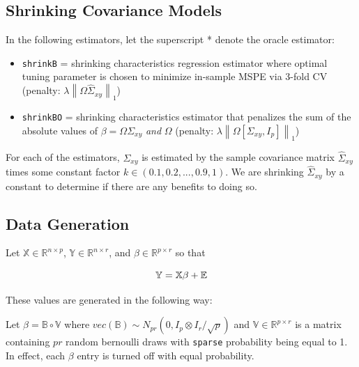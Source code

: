 \documentclass[11pt,]{report}
\begin{document}
\hypertarget{shrinking-covariance-models}{%
\subsection{Shrinking Covariance Models}\label{shrinking-covariance-models}}

In the following estimators, let the superscript * denote the oracle estimator:

\begin{itemize}
\item
  \texttt{shrinkB} = shrinking characteristics regression estimator where optimal tuning parameter is chosen to minimize in-sample MSPE via 3-fold CV (penalty: \(\lambda\left\| \Omega\hat{\Sigma}_{xy} \right\|_{1}\))
\item
  \texttt{shrinkBO} = shrinking characteristics estimator that penalizes the sum of the absolute values of \(\beta = \Omega\Sigma_{xy}\) \emph{and} \(\Omega\) (penalty: \(\lambda\left\| \Omega[\Sigma_{xy}, I_{p}] \right\|_{1}\))
\end{itemize}

For each of the estimators, \(\Sigma_{xy}\) is estimated by the sample covariance matrix \(\hat{\Sigma}_{xy}\) times some constant factor \(k \in (0.1, 0.2, ..., 0.9, 1)\). We are shrinking \(\hat{\Sigma}_{xy}\) by a constant to determine if there are any benefits to doing so.

\hypertarget{data-generation-1}{%
\subsection{Data Generation}\label{data-generation-1}}

Let \(\mathbb{X} \in \mathbb{R}^{n \times p}\), \(\mathbb{Y} \in \mathbb{R}^{n \times r}\), and \(\beta \in \mathbb{R}^{p \times r}\) so that

\begin{equation}
\mathbb{Y} = \mathbb{X}\beta + \mathbb{E}
\label{eq:datalinregression2}\notag
\end{equation}

These values are generated in the following way:

Let \(\beta = \mathbb{B} \circ \mathbb{V}\) where \(vec\left( \mathbb{B} \right) \sim N_{pr}\left( 0, I_{p} \otimes I_{r}/\sqrt{p} \right)\) and \(\mathbb{V} \in \mathbb{R}^{p \times r}\) is a matrix containing \(pr\) random bernoulli draws with \texttt{sparse} probability being equal to 1. In effect, each \(\beta\) entry is turned off with equal probability.
\end{document}
